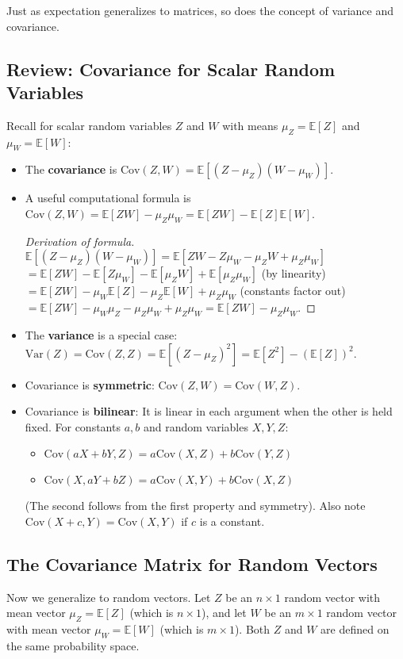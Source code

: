 \documentclass[11pt]{article}
\theoremstyle{definition}
\newcommand{\E}{\mathbb{E}}
\newcommand{\Cov}{\mathrm{Cov}}
\newcommand{\Var}{\mathrm{Var}}
\begin{document}
Just as expectation generalizes to matrices, so does the concept of variance and covariance.

\subsection{Review: Covariance for Scalar Random Variables}

Recall for scalar random variables $Z$ and $W$ with means $\mu_Z = \E[Z]$ and $\mu_W = \E[W]$:
\begin{itemize}
    \item The \textbf{covariance} is $\Cov(Z, W) = \E[(Z - \mu_Z)(W - \mu_W)]$.
    \item A useful computational formula is $\Cov(Z, W) = \E[ZW] - \mu_Z \mu_W = \E[ZW] - \E[Z]\E[W]$.
        \begin{proof}[Derivation of formula]
        $\E[(Z - \mu_Z)(W - \mu_W)] = \E[ZW - Z\mu_W - \mu_Z W + \mu_Z \mu_W]$
        $= \E[ZW] - \E[Z\mu_W] - \E[\mu_Z W] + \E[\mu_Z \mu_W]$ (by linearity)
        $= \E[ZW] - \mu_W \E[Z] - \mu_Z \E[W] + \mu_Z \mu_W$ (constants factor out)
        $= \E[ZW] - \mu_W \mu_Z - \mu_Z \mu_W + \mu_Z \mu_W = \E[ZW] - \mu_Z \mu_W$.
        \end{proof}
    \item The \textbf{variance} is a special case: $\Var(Z) = \Cov(Z, Z) = \E[(Z - \mu_Z)^2] = \E[Z^2] - (\E[Z])^2$.
    \item Covariance is \textbf{symmetric}: $\Cov(Z, W) = \Cov(W, Z)$.
    \item Covariance is \textbf{bilinear}: It is linear in each argument when the other is held fixed. For constants $a, b$ and random variables $X, Y, Z$:
        \begin{itemize}
            \item $\Cov(aX + bY, Z) = a \Cov(X, Z) + b \Cov(Y, Z)$
            \item $\Cov(X, aY + bZ) = a \Cov(X, Y) + b \Cov(X, Z)$
        \end{itemize}
        (The second follows from the first property and symmetry). Also note $\Cov(X + c, Y) = \Cov(X, Y)$ if $c$ is a constant.
\end{itemize}

\subsection{The Covariance Matrix for Random Vectors}

Now we generalize to random vectors. Let $Z$ be an $n \times 1$ random vector with mean vector $\mu_Z = \E[Z]$ (which is $n \times 1$), and let $W$ be an $m \times 1$ random vector with mean vector $\mu_W = \E[W]$ (which is $m \times 1$). Both $Z$ and $W$ are defined on the same probability space.
\end{document}
